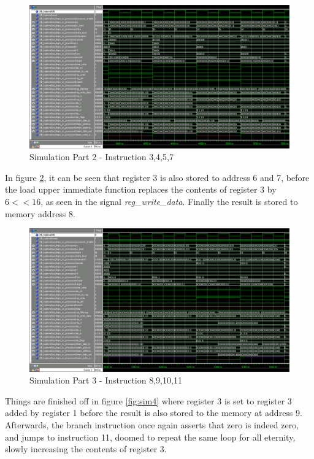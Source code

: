 \begin{figure}[ht]
    \centering
    \includegraphics[scale=0.36]{figures/sim2.png}
    \caption{\label{fig:sim2}Simulation Part 2 - Instruction 3,4,5,7}
\end{figure}

In figure \ref{fig:sim3}, it can be seen that register 3 is also stored to address 6 and 7, before the load upper immediate function replaces the contents of register 3 by $6 << 16$, as seen in the signal \emph{reg_write_data}. Finally the result is stored to memory address 8.

\begin{figure}[ht]
    \centering
    \includegraphics[scale=0.36]{figures/sim3.png}
    \caption{\label{fig:sim3}Simulation Part 3 - Instruction 8,9,10,11}
\end{figure}

Things are finished off in figure \ref{fig:sim4} where register 3 is set to register 3 added by register 1 before the result is also stored to the memory at address 9. Afterwards, the branch instruction once again asserts that zero is indeed zero, and jumps to instruction 11, doomed to repeat the same loop for all eternity, slowly increasing the contents of register 3.

